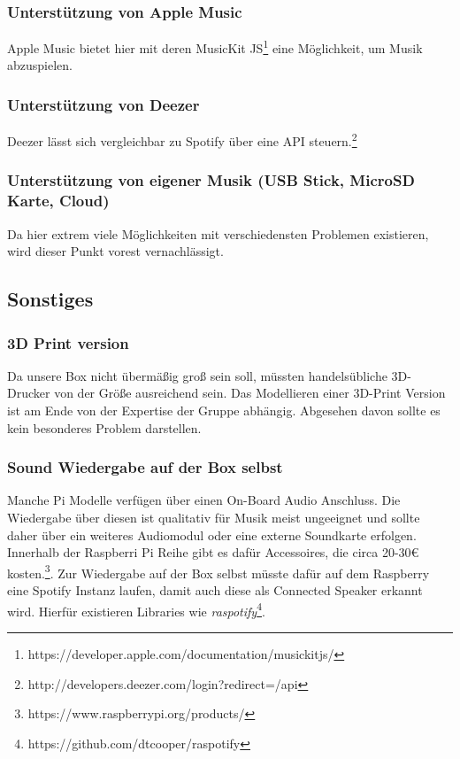 \documentclass[10pt, a4paper, draft]{article}
\begin{document}
\subsubsection{Unterstützung von Apple Music}
Apple Music bietet hier mit deren MusicKit JS\footnote{https://developer.apple.com/documentation/musickitjs/} eine Möglichkeit, um Musik abzuspielen.

\subsubsection{Unterstützung von Deezer}
Deezer lässt sich vergleichbar zu Spotify über eine API steuern.\footnote{http://developers.deezer.com/login?redirect=/api}

\subsubsection{Unterstützung von eigener Musik (USB Stick, MicroSD Karte, Cloud)}
Da hier extrem viele Möglichkeiten mit verschiedensten Problemen existieren, wird dieser Punkt vorest vernachlässigt.

\subsection{Sonstiges}
\subsubsection{3D Print version}
Da unsere Box nicht übermäßig groß sein soll, müssten handelsübliche 3D-Drucker von der Größe ausreichend sein.
Das Modellieren einer 3D-Print Version ist am Ende von der Expertise der Gruppe abhängig.
Abgesehen davon sollte es kein besonderes Problem darstellen.

\subsubsection{Sound Wiedergabe auf der Box selbst}
Manche Pi Modelle verfügen über einen On-Board Audio Anschluss.
Die Wiedergabe über diesen ist qualitativ für Musik meist ungeeignet und sollte daher über ein weiteres Audiomodul oder eine externe Soundkarte erfolgen.
Innerhalb der Raspberri Pi Reihe gibt es dafür Accessoires, die circa 20-30€ kosten.\footnote{https://www.raspberrypi.org/products/}.
Zur Wiedergabe auf der Box selbst müsste dafür auf dem Raspberry eine Spotify Instanz laufen, damit auch diese als Connected Speaker erkannt wird.
Hierfür existieren Libraries wie \textit{raspotify}\footnote{https://github.com/dtcooper/raspotify}.
\end{document}
